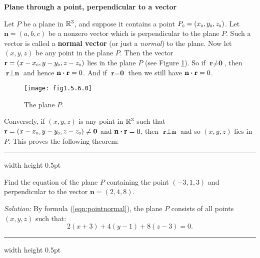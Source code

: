 \par\noindent\textbf{\large{Plane through a point, perpendicular to a vector}}\normalsize\smallskip

Let $P$ be a plane in $\mathbb{R}^{3}$, and suppose it contains a point
$P_{\scriptscriptstyle 0} = (x_{\scriptscriptstyle 0},y_{\scriptscriptstyle 0},z_{\scriptscriptstyle 0})$. Let $\textbf{n} = (a,b,c)$ be a nonzero vector which is
perpendicular to the plane $P$. Such a vector is called a \textbf{normal vector} (or just a \emph{normal}) to the plane.
 Now let $(x,y,z)$ be any point in the plane $P$. 
Then the vector
$\textbf{r} = (x - x_{\scriptscriptstyle 0},y - y_{\scriptscriptstyle 0},z - z_{\scriptscriptstyle 0})$ lies in the plane $P$ (see Figure \ref{fig:planenorm}).
So if $\textbf{r} \ne \textbf{0}$, then $\textbf{r} \perp \textbf{n}$ and hence $\textbf{n} \bm{\cdot} \textbf{r} = 0$.
And if $\textbf{r} = \textbf{0}$ then we still have $\textbf{n} \bm{\cdot} \textbf{r} = 0$.

\begin{figure}[h]
 \begin{center}
  \texttt{[image: fig1.5.6.0]}
 \end{center}
 \caption[]{\quad The plane $P$.}
 \label{fig:planenorm}
\end{figure}

Conversely, if $(x,y,z)$ is any point in $\mathbb{R}^{3}$ such that $\textbf{r} = (x - x_{\scriptscriptstyle 0},y - y_{\scriptscriptstyle 0},z -
z_{\scriptscriptstyle 0}) \ne \textbf{0}$ and $\textbf{n} \bm{\cdot} \textbf{r} = 0$, then $\textbf{r} \perp \textbf{n}$ and
so $(x,y,z)$ lies in $P$. This proves the following theorem:

\hrule width \textwidth height 0.5pt
\begin{exmp}\label{exmp:pointnormal}
 Find the equation of the plane $P$ containing the point $(-3,1,3)$ and perpendicular to the vector $\textbf{n} =
 (2,4,8)$.\smallskip
 \par\noindent\emph{Solution:} By formula (\ref{eqn:pointnormal}), the plane $P$ consists of all points $(x,y,z)$ such
 that:
 \begin{displaymath}
  2(x + 3) + 4(y - 1) + 8(z - 3) = 0.
 \end{displaymath}
\end{exmp}
\hrule width \textwidth height 0.5pt
\smallskip

